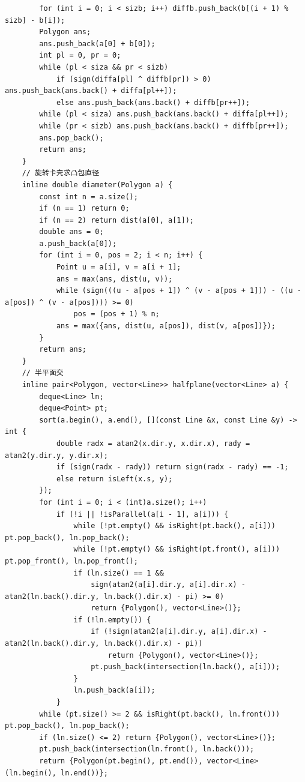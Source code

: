 \begin{verbatim}
        for (int i = 0; i < sizb; i++) diffb.push_back(b[(i + 1) % sizb] - b[i]);
        Polygon ans;
        ans.push_back(a[0] + b[0]);
        int pl = 0, pr = 0;
        while (pl < siza && pr < sizb)
            if (sign(diffa[pl] ^ diffb[pr]) > 0) ans.push_back(ans.back() + diffa[pl++]);
            else ans.push_back(ans.back() + diffb[pr++]);
        while (pl < siza) ans.push_back(ans.back() + diffa[pl++]);
        while (pr < sizb) ans.push_back(ans.back() + diffb[pr++]);
        ans.pop_back();
        return ans;
    }
    // 旋转卡壳求凸包直径
    inline double diameter(Polygon a) {
        const int n = a.size();
        if (n == 1) return 0;
        if (n == 2) return dist(a[0], a[1]);
        double ans = 0;
        a.push_back(a[0]);
        for (int i = 0, pos = 2; i < n; i++) {
            Point u = a[i], v = a[i + 1];
            ans = max(ans, dist(u, v));
            while (sign(((u - a[pos + 1]) ^ (v - a[pos + 1])) - ((u - a[pos]) ^ (v - a[pos]))) >= 0)
                pos = (pos + 1) % n;
            ans = max({ans, dist(u, a[pos]), dist(v, a[pos])});
        }
        return ans;
    }
    // 半平面交
    inline pair<Polygon, vector<Line>> halfplane(vector<Line> a) {
        deque<Line> ln;
        deque<Point> pt;
        sort(a.begin(), a.end(), [](const Line &x, const Line &y) -> int {
            double radx = atan2(x.dir.y, x.dir.x), rady = atan2(y.dir.y, y.dir.x);
            if (sign(radx - rady)) return sign(radx - rady) == -1;
            else return isLeft(x.s, y);
        });
        for (int i = 0; i < (int)a.size(); i++)
            if (!i || !isParallel(a[i - 1], a[i])) {
                while (!pt.empty() && isRight(pt.back(), a[i])) pt.pop_back(), ln.pop_back();
                while (!pt.empty() && isRight(pt.front(), a[i])) pt.pop_front(), ln.pop_front();
                if (ln.size() == 1 &&
                    sign(atan2(a[i].dir.y, a[i].dir.x) - atan2(ln.back().dir.y, ln.back().dir.x) - pi) >= 0)
                    return {Polygon(), vector<Line>()};
                if (!ln.empty()) {
                    if (!sign(atan2(a[i].dir.y, a[i].dir.x) - atan2(ln.back().dir.y, ln.back().dir.x) - pi))
                        return {Polygon(), vector<Line>()};
                    pt.push_back(intersection(ln.back(), a[i]));
                }
                ln.push_back(a[i]);
            }
        while (pt.size() >= 2 && isRight(pt.back(), ln.front())) pt.pop_back(), ln.pop_back();
        if (ln.size() <= 2) return {Polygon(), vector<Line>()};
        pt.push_back(intersection(ln.front(), ln.back()));
        return {Polygon(pt.begin(), pt.end()), vector<Line>(ln.begin(), ln.end())};

\end{verbatim}
